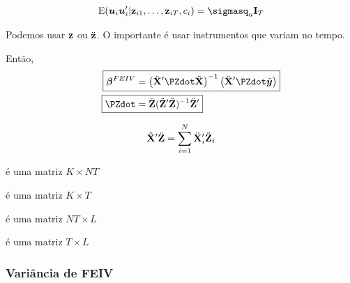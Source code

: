 \documentclass[11pt, oneside, a4paper, article]{article}
\numberwithin{equation}{section}
\begin{document}
\begin{description}
\begin{hypo}
\begin{align*}
\E(\uvec_{i} \uvec_{i}' | \zvec_{i1}, \dots, \zvec_{iT}, c_{i}) = \sigmasq_{u} \Imat_{T}
\end{align*}
\end{hypo}

\begin{obs}
	Podemos usar $\mathbf{z}$ ou $\ddot{\mathbf{z}}$.
	O importante é usar instrumentos que variam no tempo.
\end{obs}

Então, 
\begin{align*}
\Aboxed{ \betavec^{FEIV} &= 
\left( \ddot{\Xmat}' \PZdot \ddot{\Xmat} \right)^{-1}
\left( \ddot \Xmat' \PZdot \ddot \yvec\right)
}
\\
\qquad
\Aboxed{
\PZdot &= \ddot \Zmat ( \ddot \Zmat' \ddot \Zmat)^{-1} \ddot \Zmat'}
\end{align*}

\begin{obs}
\begin{align*}
	\ddot {\mathbf{X}}' \ddot {\mathbf{Z}} = \sum_{i=1}^{N} \ddot {\mathbf{X}}_{i}' \ddot {\mathbf{Z}}_{i}
\end{align*}

\begin{description}[noitemsep]
	\item[$\ddot \Xmat'$] é uma matriz $K \times NT$ 
	\item[$\ddot \Xmat_{i}'$] é uma matriz $K \times T$ 
	\item[$\ddot \Zmat$] é uma matriz $NT \times L$ 
	\item[$\ddot \Zmat_{i}$] é uma matriz $T \times L$ 
\end{description}

\end{obs}

\subsubsection{Variância de FEIV}


\end{description}
\end{document}
